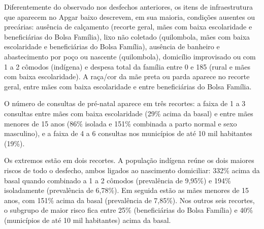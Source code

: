 Diferentemente do observado nos desfechos anteriores, os itens de infraestrutura que aparecem no Apgar baixo descrevem, em sua maioria, condições ausentes ou precárias: ausência de calçamento (recorte geral, mães com baixa escolaridade e beneficiárias do Bolsa Família), lixo não coletado (quilombola, mães com baixa escolaridade e beneficiárias do Bolsa Família), ausência de banheiro e abastecimento por poço ou nascente (quilombola), domicílio improvisado ou com 1 a 2 cômodos (indígena) e despesa total da família entre 0 e 185 (rural e mães com baixa escolaridade). A raça/cor da mãe preta ou parda aparece no recorte geral, entre mães com baixa escolaridade e entre beneficiárias do Bolsa Família.

O número de consultas de pré-natal aparece em três recortes: a faixa de 1 a 3 consultas entre mães com baixa escolaridade (29\% acima da basal) e entre mães menores de 15 anos (86\% isolada e 151\% combinada a parto normal e sexo masculino), e a faixa de 4 a 6 consultas nos municípios de até 10 mil habitantes (19\%).

Os extremos estão em dois recortes. A população indígena reúne os dois maiores riscos de todo o desfecho, ambos ligados ao nascimento domiciliar: 332\% acima da basal quando combinado a 1 a 2 cômodos (prevalência de 9,95\%) e 194\% isoladamente (prevalência de 6,78\%). Em seguida estão as mães menores de 15 anos, com 151\% acima da basal (prevalência de 7,85\%). Nos outros seis recortes, o subgrupo de maior risco fica entre 25\% (beneficiárias do Bolsa Família) e 40\% (municípios de até 10 mil habitantes) acima da basal.

\FloatBarrier
